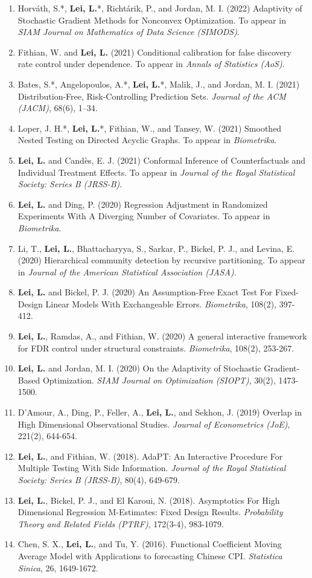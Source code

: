\documentclass{article}
\begin{document}
\begin{enumerate}
\item Horv\'{a}th, S.*, \textbf{Lei, L.}*, Richt\'{a}rik, P., and Jordan, M. I. (2022) Adaptivity of Stochastic Gradient Methods for Nonconvex Optimization. To appear in \emph{SIAM Journal on Mathematics of Data Science (SIMODS)}.
\item Fithian, W. and \textbf{Lei, L.} (2021) Conditional calibration for false discovery rate control under dependence. To appear in \emph{Annals of Statistics (AoS)}.
\item Bates, S.*, Angelopoulos, A.*, \textbf{Lei, L.}*, Malik, J., and Jordan, M. I. (2021) Distribution-Free, Risk-Controlling Prediction Sets. \emph{Journal of the ACM (JACM)}, 68(6), 1–34.
\item Loper, J. H.*, \textbf{Lei, L.}*, Fithian, W., and Tansey, W. (2021) Smoothed Nested Testing on Directed Acyclic Graphs. To appear in \emph{Biometrika}.
\item \textbf{Lei, L.} and Cand\`{e}s, E. J. (2021) Conformal Inference of Counterfactuals and Individual Treatment Effects. To appear in \emph{Journal of the Royal Statistical Society: Series B (JRSS-B)}.
\item \textbf{Lei, L.} and Ding, P. (2020) Regression Adjustment in Randomized Experiments With A Diverging Number of Covariates. To appear in \emph{Biometrika}.
\item Li, T., \textbf{Lei, L.}, Bhattacharyya, S., Sarkar, P., Bickel, P. J., and Levina, E. (2020) Hierarchical community detection by recursive partitioning. To appear in \emph{Journal of the American Statistical Association (JASA)}.
\item \textbf{Lei, L.} and Bickel, P. J. (2020) An Assumption-Free Exact Test For Fixed-Design Linear Models With Exchangeable Errors. \emph{Biometrika}, 108(2), 397-412.
\item \textbf{Lei, L.}, Ramdas, A., and Fithian, W. (2020) A general interactive framework for FDR control under structural constraints. \emph{Biometrika}, 108(2), 253-267.
\item \textbf{Lei, L.} and Jordan, M. I. (2020) On the Adaptivity of Stochastic Gradient-Based Optimization. \emph{SIAM Journal on Optimization (SIOPT)}, 30(2), 1473-1500.
\item D'Amour, A., Ding, P., Feller, A., \textbf{Lei, L.}, and Sekhon, J. (2019) Overlap in High Dimensional Observational Studies. \emph{Journal of Econometrics (JoE)}, 221(2), 644-654.
\item \textbf{Lei, L.}, and Fithian, W. (2018). AdaPT: An Interactive Procedure For Multiple Testing With Side Information. \emph{Journal of the Royal Statistical Society: Series B (JRSS-B)}, 80(4), 649-679.
\item \textbf{Lei, L.}, Bickel, P. J., and El Karoui, N. (2018). Asymptotics For High Dimensional Regression M-Estimates: Fixed Design Results. \emph{Probability Theory and Related Fields (PTRF)}, 172(3-4), 983-1079.
\item Chen, S. X., \textbf{Lei, L.}, and Tu, Y. (2016). Functional Coefficient Moving Average Model with Applications to forecasting Chinese CPI. \emph{Statistica Sinica}, 26, 1649-1672.
\end{enumerate}
\end{document}

